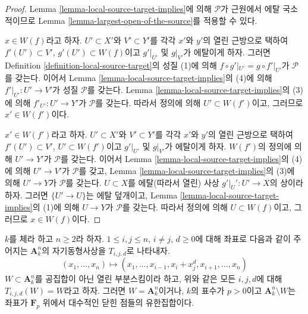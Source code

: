 \begin{proof}
Lemma \ref{lemma-local-source-target-implies}에 의해 $\mathcal{P}$가
근원에서 에탈 국소적이므로 Lemma
\ref{lemma-largest-open-of-the-source}를 적용할 수 있다.

\medskip\noindent
$x \in W(f)$라고 하자. $U' \subset X'$와 $V' \subset Y'$를 각각
$x'$와 $y'$의 열린 근방으로 택하여 $f'(U') \subset V'$,
$g'(U') \subset W(f)$이고 $g'|_{U'}$ 및 $g|_{V'}$가 에탈이게 하자.
그러면 Definition \ref{definition-local-source-target}의 성질 (1)에 의해
$f \circ g'|_{U'} = g \circ f'|_{U'}$가 $\mathcal{P}$를 갖는다.
이어서 Lemma \ref{lemma-local-source-target-implies}의 (4)에 의해
$f'|_{U'} : U' \to V'$가 성질 $\mathcal{P}$를 갖는다. Lemma
\ref{lemma-local-source-target-implies}의 (3)에 의해
$f'_{U'} : U' \to Y'$가 $\mathcal{P}$를 갖는다.
따라서 정의에 의해 $U' \subset W(f')$이고, 그러므로
$x' \in W(f')$이다.

\medskip\noindent
$x' \in W(f')$라고 하자. $U' \subset X'$와 $V' \subset Y'$를 각각
$x'$와 $y'$의 열린 근방으로 택하여 $f'(U') \subset V'$,
$U' \subset W(f')$이고 $g'|_{U'}$ 및 $g|_{V'}$가 에탈이게 하자.
$W(f')$의 정의에 의해 $U' \to Y'$가 $\mathcal{P}$를 갖는다.
이어서 Lemma \ref{lemma-local-source-target-implies}의 (4)에 의해
$U' \to V'$가 $\mathcal{P}$를 갖고, Lemma
\ref{lemma-local-source-target-implies}의 (3)에 의해 $U' \to Y$가
$\mathcal{P}$를 갖는다. $U \subset X$를 에탈(따라서
열린) 사상 $g'|_U' : U' \to X$의 상이라 하자. 그러면
$\{U' \to U\}$는 에탈 덮개이고, Lemma
\ref{lemma-local-source-target-implies}의 (1)에 의해 $U \to Y$가
$\mathcal{P}$를 갖는다. 따라서 정의에 의해 $U \subset W(f)$이고,
그러므로 $x \in W(f)$이다.
\end{proof}

\begin{lemma}
\label{lemma-orbits}
$k$를 체라 하고 $n \geq 2$라 하자. $1 \leq i, j \leq n$,
$i \not = j$, $d \geq 0$에 대해 좌표로 다음과 같이 주어지는
$\mathbf{A}^n_k$의 자기동형사상을 $T_{i, j, d}$로 나타내자.
$$
(x_1, \ldots, x_n) \longmapsto
(x_1, \ldots, x_{i - 1}, x_i + x_j^d, x_{i + 1}, \ldots, x_n)
$$
$W \subset \mathbf{A}^n_k$를 공집합이 아닌 열린 부분스킴이라 하고,
위와 같은 모든 $i, j, d$에 대해 $T_{i, j, d}(W) = W$라고 하자.
그러면 $W = \mathbf{A}^n_k$이거나, $k$의 표수가 $p > 0$이고
$\mathbf{A}^n_k \setminus W$는 좌표가 $\mathbf{F}_p$ 위에서 대수적인
닫힌 점들의 유한집합이다.
\end{lemma}

